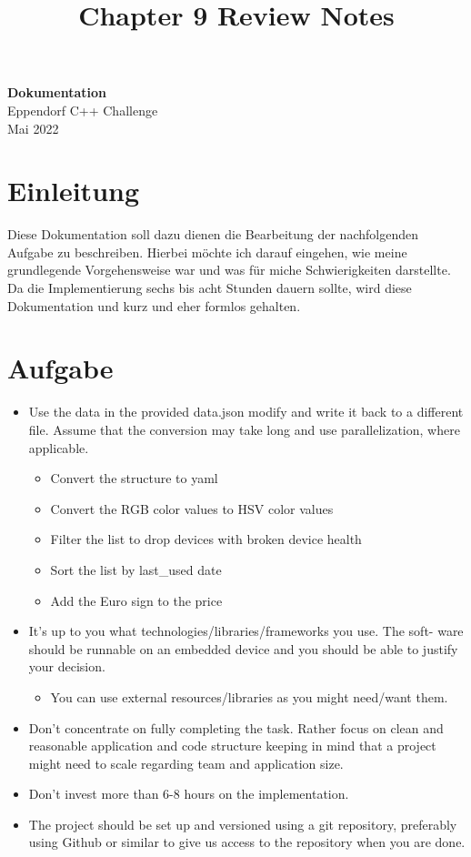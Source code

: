 \documentclass[11pt]{article}
\theoremstyle{definition}
\begin{document}
\title{Chapter 9 Review Notes}

\thispagestyle{empty}

\begin{center}
{\LARGE \bf Dokumentation}\\
{\large Eppendorf C++ Challenge}\\
Mai 2022
\end{center}


\section{Einleitung}
Diese Dokumentation soll dazu dienen die Bearbeitung der nachfolgenden Aufgabe zu beschreiben.
Hierbei möchte ich darauf eingehen, wie meine grundlegende Vorgehensweise war und was für miche Schwierigkeiten darstellte. Da die Implementierung sechs bis acht Stunden dauern sollte, wird diese Dokumentation und kurz und eher formlos gehalten.

\section{Aufgabe}
\label{Aufgabenstellung}
\begin{itemize}
	\item Use the data in the provided data.json modify and write it back to a different file. Assume that the conversion may take long and use parallelization, where applicable.
		\begin{itemize}
			\item Convert the structure to yaml 
			\item Convert the RGB color values to HSV color values 
			\item Filter the list to drop devices with broken device health 
			\item Sort the list by last\_used date 
			\item Add the Euro sign to the price
		\end{itemize}
	\item It’s up to you what technologies/libraries/frameworks you use. The soft- ware should be runnable on an embedded device and you should be able to justify your decision.
		\begin{itemize}
			\item You can use external resources/libraries as you might need/want them.
		\end{itemize}
	\item Don’t concentrate on fully completing the task. Rather focus on clean and reasonable application and code structure keeping in mind that a project might need to scale regarding team and application size.
	\item Don’t invest more than 6-8 hours on the implementation.
	\item The project should be set up and versioned using a git repository, preferably using Github or similar to give us access to the repository when you are done.
\end{itemize}
\end{document}
